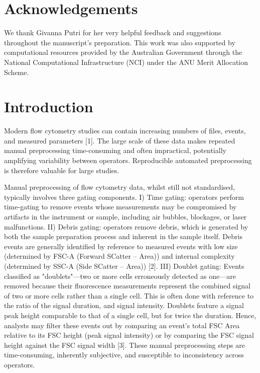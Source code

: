 \documentclass[ASNA]{latex/wiley/USG}
\begin{document}
\section*{Acknowledgements}
We thank Givanna Putri for her very helpful feedback and suggestions
throughout the manuscript's preparation. This work was also supported by
computational resources provided by the Australian Government through
the National Computational Infrastructure (NCI) under the ANU Merit
Allocation Scheme.

\FloatBarrier

\section{Introduction}\label{introduction}

Modern flow cytometry studies can contain increasing numbers of files,
events, and measured parameters {[}1{]}. The large scale of these data
makes repeated manual preprocessing time-consuming and often
impractical, potentially amplifying variability between operators.
Reproducible automated preprocessing is therefore valuable for large
studies.

Manual preprocessing of flow cytometry data, whilst still not
standardised, typically involves three gating components. I) Time
gating: operators perform time-gating to remove events whose
measurements may be compromised by artifacts in the instrument or
sample, including air bubbles, blockages, or laser malfunctions. II)
Debris gating: operators remove debris, which is generated by both the
sample preparation process and inherent in the sample itself. Debris
events are generally identified by reference to measured events with low
size (determined by FSC-A (Forward SCatter -- Area)) and internal
complexity (determined by SSC-A (Side SCatter -- Area)) {[}2{]}. III)
Doublet gating: Events classified as "doublets"---two or more cells
erroneously detected as one---are removed because their fluorescence
measurements represent the combined signal of two or more cells rather
than a single cell. This is often done with reference to the ratio of
the signal duration, and signal intensity. Doublets feature a signal
peak height comparable to that of a single cell, but for twice the
duration. Hence, analysts may filter these events out by comparing an
event's total FSC Area relative to its FSC height (peak signal
intensity) or by comparing the FSC signal height against the FSC signal
width {[}3{]}. These manual preprocessing steps are time-consuming,
inherently subjective, and susceptible to inconsistency across
operators.
\end{document}
